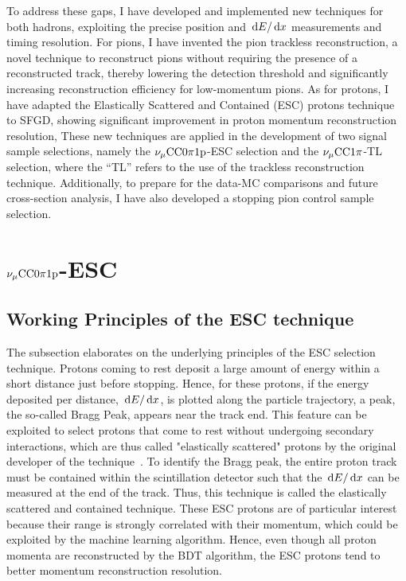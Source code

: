 To address these gaps, I have developed and implemented new techniques for both hadrons, exploiting the precise position and $\,\textrm{d}E/\,\textrm{d}x$ measurements and timing resolution.
For pions, I have invented the pion trackless reconstruction, a novel technique to reconstruct pions without requiring the presence of a reconstructed track, thereby lowering the detection threshold and significantly increasing reconstruction efficiency for low-momentum pions. 
As for protons, I have adapted the Elastically Scattered and Contained (ESC) protons technique~\cite{Lu:2016mjf} to SFGD, showing significant improvement in proton momentum reconstruction resolution,  
These new techniques are applied in the development of two signal sample selections, namely the $\nu_{\mu}\textrm{CC}0\pi1\textrm{p}$-ESC selection and the $\nu_{\mu}\textrm{CC}1\pi$-TL selection, where the ``TL'' refers to the use of the trackless reconstruction technique.
Additionally, to prepare for the data-MC comparisons and future cross-section analysis, I have also developed a stopping pion control sample selection.

\section{$\nu_{\mu}\textrm{CC}0\pi1\textrm{p}$-ESC}
\label{sec:sel-esc}
    \subsection{Working Principles of the ESC technique}
    \label{sec:sel-esc-wp}
     The subsection elaborates on the underlying principles of the ESC selection technique.
     Protons coming to rest deposit a large amount of energy within a short distance just before stopping.
     Hence, for these protons, if the energy deposited per distance, $\,\textrm{d}E/\,\textrm{d}x$, is plotted along the particle trajectory, a peak, the so-called Bragg Peak, appears near the track end.
     This feature can be exploited to select protons that come to rest without undergoing secondary interactions, which are thus called "elastically scattered" protons by the original developer of the technique~\cite{Lu:2016mjf}.
     To identify the Bragg peak, the entire proton track must be contained within the scintillation detector such that the $\,\textrm{d}E/\,\textrm{d}x$ can be measured at the end of the track.
     Thus, this technique is called the elastically scattered and contained technique.
     These ESC protons are of particular interest because their range is strongly correlated with their momentum, which could be exploited by the machine learning algorithm.
     Hence, even though all proton momenta are reconstructed by the BDT algorithm, the ESC protons tend to better momentum reconstruction resolution.

